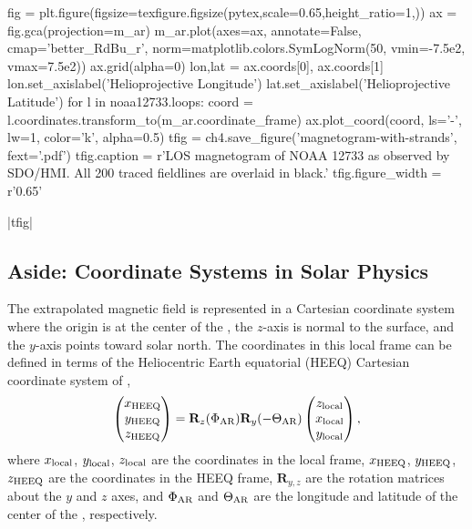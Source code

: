 \begin{pycode}[chapter4]
fig = plt.figure(figsize=texfigure.figsize(pytex,scale=0.65,height_ratio=1,))
ax = fig.gca(projection=m_ar)
m_ar.plot(axes=ax, annotate=False, cmap='better_RdBu_r',
          norm=matplotlib.colors.SymLogNorm(50, vmin=-7.5e2, vmax=7.5e2))
ax.grid(alpha=0)
lon,lat = ax.coords[0], ax.coords[1]
lon.set_axislabel('Helioprojective Longitude')
lat.set_axislabel('Helioprojective Latitude')
for l in noaa12733.loops:
    coord = l.coordinates.transform_to(m_ar.coordinate_frame)
    ax.plot_coord(coord, ls='-', lw=1, color='k', alpha=0.5)
tfig = ch4.save_figure('magnetogram-with-strands', fext='.pdf')
tfig.caption = r'LOS magnetogram of NOAA 12733 as observed by SDO/HMI. All 200 traced fieldlines are overlaid in black.'
tfig.figure_width = r'0.65\textwidth'
\end{pycode}
\py[chapter4]|tfig|

\subsection{Aside: Coordinate Systems in Solar Physics}\label{sec:coordinates}

The extrapolated magnetic field is represented in a Cartesian coordinate system where the origin is at the center of the \AR{}, the $z$-axis is normal to the surface, and the $y$-axis points toward solar north. The coordinates in this local \AR{} frame can be defined in terms of the Heliocentric Earth equatorial (HEEQ) Cartesian coordinate system of \citet{hapgood_space_1992},
\begin{equation}\label{eq:local_heeq_transform}
    \begin{pmatrix}x_\textup{HEEQ} \\ y_\textup{HEEQ} \\ z_\textup{HEEQ}\end{pmatrix}
    = \mathbf{R}_z(\Phi_\textup{AR})\mathbf{R}_y(-\Theta_\textup{AR})
    \begin{pmatrix}z_\textup{local} \\ x_\textup{local} \\ y_\textup{local}\end{pmatrix},
\end{equation}
where $x_\textup{local}$, $y_\textup{local}$, $z_\textup{local}$ are the coordinates in the local \AR{} frame, $x_\textup{HEEQ}$, $y_\textup{HEEQ}$, $z_\textup{HEEQ}$ are the coordinates in the HEEQ frame, $\mathbf{R}_{y,z}$ are the rotation matrices about the $y$ and $z$ axes, and $\Phi_\textup{AR}$ and $\Theta_\textup{AR}$ are the longitude and latitude of the center of the \AR{}, respectively.

